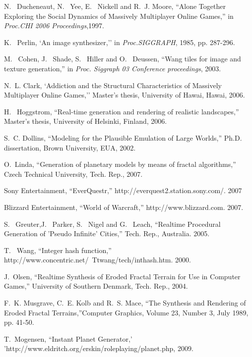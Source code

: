 \documentclass[10pt, conference, compsocconf]{IEEEtran}
\begin{document}
\begin{thebibliography}{21}

N. ~Ducheneaut, N. ~Yee, E. ~Nickell and R.~J. Moore, ``Alone Together Exploring the Social Dynamics of Massively Multiplayer Online Games,'' in \emph{Proc.CHI 2006 Proceedings},1997.

K. ~Perlin, `An image synthesizer,'' in \emph{Proc.SIGGRAPH}, 1985, pp.
  287-296.

M. ~Cohen, J.~ Shade, S. ~Hiller and O. ~Deussen, ``Wang tiles for image and texture generation,'' in \emph{Proc. Siggraph 03 Conference proceedings}, 2003.

N.~L. Clark, `Addiction and the Structural Characteristics of Massively Multiplayer Online Games,''
  Master's thesis, University of Hawai, Hawai, 2006.

H. ~Hoggstrom, ``Real-time generation and rendering of realistic landscapes,''
  Master's thesis, University of Helsinki, Finland, 2006.

S.~C. Dollins, ``Modeling for the Plausible Emulation of Large Worlds,'' Ph.D. dissertation, Brown University, EUA, 2002.

O.~Linda, ``Generation of planetary models by means of fractal algorithms,'' Czech Technical University, Tech. Rep., 2007.

Sony Entertainment, ``EverQuestr,''  http://everquest2.station.sony.com/. 2007

Blizzard Entertainment, ``World of Warcraft,'' http://www.blizzard.com. 2007.

S. ~Greuter,J.~ Parker, S.~ Nigel and G.~ Leach, ``Real\-time Procedural Generation of 'Pseudo Infinite' Cities,'' Tech. Rep., Australia. 2005.

T. ~Wang, ``Integer hash function,'' http://www.concentric.net/~Ttwang/tech/inthash.htm. 2000.

J.~Olsen, ``Realtime Synthesis of Eroded Fractal Terrain for Use in Computer Games,'' University of Southern Denmark, Tech. Rep., 2004.

F.~K. Musgrave, C.~E. Kolb and  R.~S. Mace, ``The Synthesis and Rendering of Eroded Fractal Terrains,''Computer Graphics, Volume 23, Number 3, July 1989, pp. 41-50.

T.~Mogensen, ``Instant Planet Generator,' 'http://www.eldritch.org/erskin/roleplaying/planet.php, 2009.


\end{thebibliography}
\end{document}
